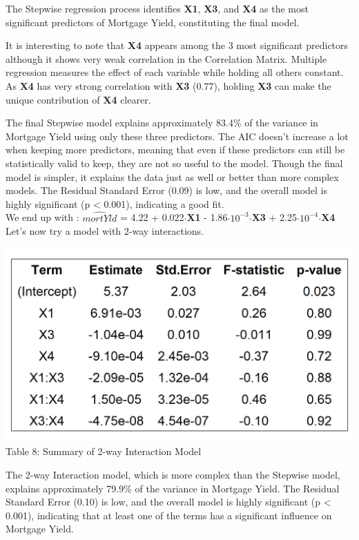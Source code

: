 \documentclass[
  12pt,
]{article}
\begin{document}
The Stepwise regression process identifies \textbf{X1}, \textbf{X3}, and
\textbf{X4} as the most significant predictors of Mortgage Yield,
constituting the final model.

It is interesting to note that \textbf{X4} appears among the 3 most
significant predictors although it shows very weak correlation in the
Correlation Matrix. Multiple regression measures the effect of each
variable while holding all others constant. As \textbf{X4} has very
strong correlation with \textbf{X3} (0.77), holding \textbf{X3} can make
the unique contribution of \textbf{X4} clearer.

The final Stepwise model explains approximately 83.4\% of the variance
in Mortgage Yield using only these three predictors. The AIC doesn't
increase a lot when keeping more predictors, meaning that even if these
predictors can still be statistically valid to keep, they are not so
useful to the model. Though the final model is simpler, it explains the
data just as well or better than more complex models. The Residual
Standard Error (0.09) is low, and the overall model is highly
significant (p \textless{} 0.001), indicating a good fit.\\
We end up with : \(\hat{mortYld}\) = 4.22 + 0.022\(\cdot\)\textbf{X1} -
1.86\(\cdot\)\(10^{-3}\)\(\cdot\)\textbf{X3} +
2.25\(\cdot\)\(10^{-4}\)\(\cdot\)\textbf{X4}\\
Let's now try a model with 2-way interactions.

\begin{minipage}{0.5\textwidth}
\includegraphics[width=1\linewidth]{figures/interaction_model_coef.png}
\vspace{-2em}
\fontsize{12}{12}\selectfont Table 8: Summary of 2-way Interaction Model
\end{minipage}
\hfill
\begin{minipage}{0.48\textwidth}
The 2-way Interaction model, which is more complex than the Stepwise
model, explains approximately 79.9\% of the variance in Mortgage Yield.
The Residual Standard Error (0.10) is low, and the overall model is
highly significant (p < 0.001), indicating that at least one of the
terms has a significant influence on Mortgage Yield.
\end{minipage}
\end{document}
